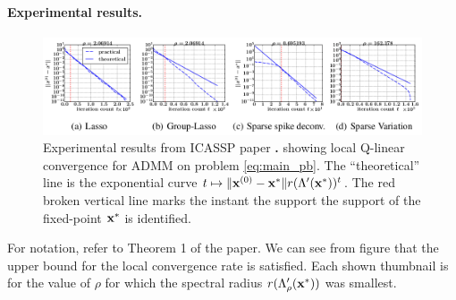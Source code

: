 \paragraph{Experimental results.}
\begin{figure}[!htbp]
  \includegraphics[width=1\linewidth]{figures/admm.png}
  \caption{{Experimental results from ICASSP paper}  \citep{dohmatob2015local}\textbf{.} showing local Q-linear convergence for ADMM
    on problem \eqref{eq:main_pb}. %
  The ``theoretical'' line is the exponential
  curve $t \mapsto \|\mathbf{x}^{(0)} - \mathbf{x}^*\|r(\Lambda'(\mathbf{x}^*))^t$. The red broken
  vertical line marks the instant the support the support of the fixed-point $\mathbf{x}^*$
  is identified.
}  
\end{figure}
 For notation, refer to Theorem 1 of the paper.
  We can see from figure that the upper bound for the local convergence
  rate is satisfied. Each shown thumbnail
  is for the value of $\rho$ for
  which the spectral radius $r(\Lambda_\rho'(\mathbf{x}^*))$ was smallest.
  








